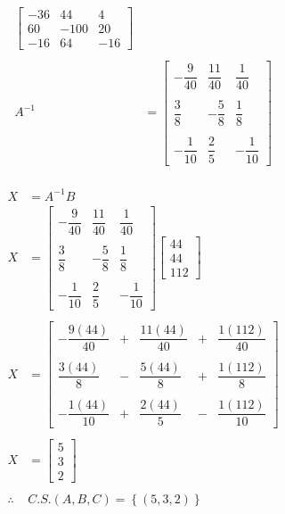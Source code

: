 \documentclass[11pt, a4paper]{article}
\begin{document}
\begin{multicols}{2}
\begin{align*}
\begin{bmatrix}
      -36 & 44 & 4\\
      60 & -100 & 20\\
      -16 & 64 & -16
    \end{bmatrix}\\\\
    A^{-1} &= \begin{bmatrix}
      -\dfrac{9}{40} & \dfrac{11}{40} & \dfrac{1}{40}\\\\
      \dfrac{3}{8} & -\dfrac{5}{8} & \dfrac{1}{8}\\\\
      -\dfrac{1}{10} & \dfrac{2}{5} & -\dfrac{1}{10}
    \end{bmatrix}
  \end{align*}\\
  \begin{align*}
    X &= A^{-1}B\\
    X &= \begin{bmatrix}
      -\dfrac{9}{40} & \dfrac{11}{40} & \dfrac{1}{40}\\\\
      \dfrac{3}{8} & -\dfrac{5}{8} & \dfrac{1}{8}\\\\
      -\dfrac{1}{10} & \dfrac{2}{5} & -\dfrac{1}{10}
    \end{bmatrix}\begin{bmatrix}
      44\\
      44\\
      112
    \end{bmatrix}\\\\
    X &= \begin{bmatrix}
      -\dfrac{9\left(44\right)}{40}&+&\dfrac{11\left(44\right)}{40}&+&\dfrac{1\left(112\right)}{40}\\\\
      \dfrac{3\left(44\right)}{8}&-&\dfrac{5\left(44\right)}{8}&+&\dfrac{1\left(112\right)}{8}\\\\
      -\dfrac{1\left(44\right)}{10}&+&\dfrac{2\left(44\right)}{5}&-&\dfrac{1\left(112\right)}{10}
    \end{bmatrix}\\\\
    X &= \begin{bmatrix}
      5\\
      3\\
      2
    \end{bmatrix}\\\\
    \therefore \ &C.S. \left(A,B,C\right) = \left\{\left(5,3,2\right)\right\}
  \end{align*}
\end{multicols}
\newpage
\end{document}
